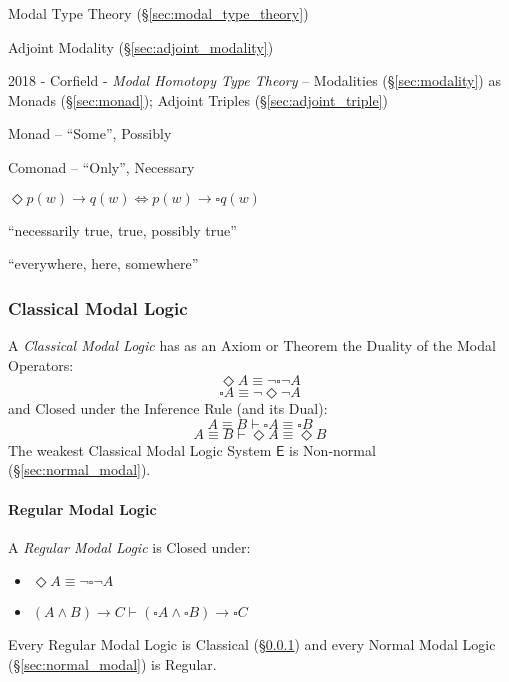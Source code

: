 Modal Type Theory (\S\ref{sec:modal_type_theory})

Adjoint Modality (\S\ref{sec:adjoint_modality})

2018 - Corfield - \emph{Modal Homotopy Type Theory} -- Modalities
(\S\ref{sec:modality}) as Monads (\S\ref{sec:monad}); Adjoint Triples
(\S\ref{sec:adjoint_triple})

Monad -- ``Some'', Possibly

Comonad -- ``Only'', Necessary

$\Diamond p(w) \rightarrow q(w) \Leftrightarrow p(w) \rightarrow \square q(w)$

``necessarily true, true, possibly true''

``everywhere, here, somewhere''



\subsubsection{Classical Modal Logic}\label{sec:classical_modal}

A \emph{Classical Modal Logic} has as an Axiom or Theorem the Duality
of the Modal Operators:
\[
  \Diamond A \equiv \neg \square \neg A
\]\[
  \square A \equiv \neg \Diamond \neg A
\]
and Closed under the Inference Rule (and its Dual):
\[
  A \equiv B \vdash \square A \equiv \square B
\]\[
  A \equiv B \vdash \Diamond A \equiv \Diamond B
\]
The weakest Classical Modal Logic System $\mathsf{E}$ is Non-normal
(\S\ref{sec:normal_modal}).



\paragraph{Regular Modal Logic}\label{sec:regular_modal}\hfill

A \emph{Regular Modal Logic} is Closed under:
\begin {itemize}

\item $\Diamond A \equiv \neg \square \neg A$

\item $(A \wedge B) \rightarrow C \vdash
  (\square A \wedge \square B) \rightarrow \square C$

\end {itemize}
Every Regular Modal Logic is Classical (\S\ref{sec:classical_modal})
and every Normal Modal Logic (\S\ref{sec:normal_modal}) is Regular.



